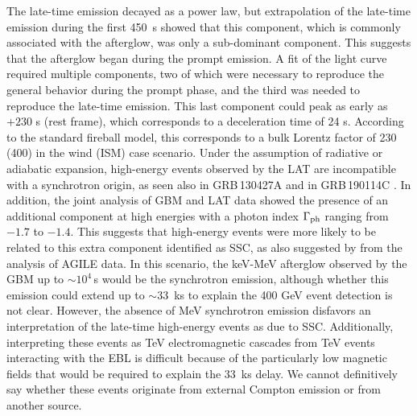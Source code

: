 \documentclass[preprint]{aastex631}
\begin{document}
The late-time emission decayed as a power law, but extrapolation of the late-time emission during the first 450~s showed that this component, which is commonly associated with the afterglow, was only a sub-dominant component. This suggests that the afterglow began during the prompt emission. A fit of the light curve required multiple components, two of which were necessary to reproduce the general behavior during the prompt phase, and the third was needed to reproduce the late-time emission. 
This last component could peak as early as \trig$+230$ s (rest frame), which corresponds to a deceleration time of 24 s. According to the standard fireball model, this corresponds to a bulk Lorentz factor of 230 (400) in the wind (ISM) case scenario.
Under the assumption of radiative or adiabatic expansion, high-energy events observed by the LAT are incompatible with a synchrotron origin, as seen also in GRB\,130427A \citep{2014Sci...343...42A} and in GRB\,190114C \citep{2020ApJ...890....9A}. 
In addition, the joint analysis of GBM and LAT data showed the presence of an additional component at high energies with a photon index $\Gamma_{\rm ph}$ ranging from $-1.7$ to $-1.4$. This suggests that high-energy events were more likely to be related to this extra component identified as SSC, as also suggested  by \citet{BOAT_AGILE} from the analysis of AGILE data. 
In this scenario, the keV-MeV afterglow observed by the GBM up to $\sim 10^{4}$\,s would be the synchrotron emission, although whether this emission could extend up to $\sim 33$~ks to explain the 400 GeV event detection is not clear.
However, the absence of MeV synchrotron emission disfavors an interpretation of the late-time high-energy events as due to SSC. 
Additionally, interpreting these events as TeV electromagnetic cascades from TeV events interacting with the EBL is difficult because of the particularly low magnetic fields that would be required to explain the 33~ks delay. 
We cannot definitively say whether these events originate from external Compton emission or from another source.
\end{document}
